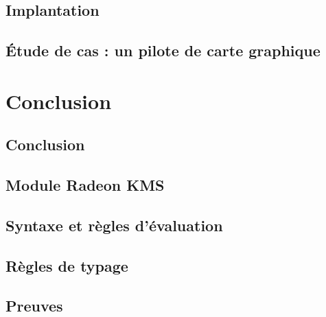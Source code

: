\documentclass[a4paper,11pt]{memoir}
\def\partintro{}
\begin{document}
\chapter{Implantation}

\label{cha:implem}


\chapter{Étude de cas : un pilote de carte graphique}

\label{cha:etudedecas}


\def\partintro{}


\part{Conclusion}

\chapter{Conclusion}

\label{cha:conclusion}


\def\partintro{}
\appendix
\renewcommand{\appendixpagename}{Annexes}
\renewcommand{\appendixtocname}{\appendixpagename}
\appendixpage*

\chapter{Module Radeon KMS}

\label{cha:code-noyau}


\chapter{Syntaxe et règles d'évaluation}
\label{anx:eval}



\chapter{Règles de typage}
\label{anx:typage}



\chapter{Preuves}
\end{document}
